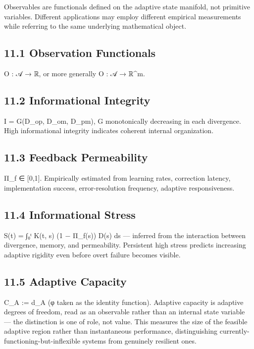 \documentclass[
]{article}
\begin{document}
Observables are functionals defined on the adaptive state manifold, not
primitive variables. Different applications may employ different
empirical measurements while referring to the same underlying
mathematical object.

\hypertarget{observation-functionals}{%
\subsection{11.1 Observation
Functionals}\label{observation-functionals}}

O : 𝒜 → ℝ, or more generally O : 𝒜 → ℝ\^{}m.

\hypertarget{informational-integrity-1}{%
\subsection{11.2 Informational
Integrity}\label{informational-integrity-1}}

I = G(D\_op, D\_om, D\_pm), G monotonically decreasing in each
divergence. High informational integrity indicates coherent internal
organization.

\hypertarget{feedback-permeability-1}{%
\subsection{11.3 Feedback Permeability}\label{feedback-permeability-1}}

Π\_f ∈ {[}0,1{]}. Empirically estimated from learning rates, correction
latency, implementation success, error-resolution frequency, adaptive
responsiveness.

\hypertarget{informational-stress-1}{%
\subsection{11.4 Informational Stress}\label{informational-stress-1}}

S(t) = ∫₀ᵗ K(t, s) (1 − Π\_f(s)) D(s) ds --- inferred from the
interaction between divergence, memory, and permeability. Persistent
high stress predicts increasing adaptive rigidity even before overt
failure becomes visible.

\hypertarget{adaptive-capacity}{%
\subsection{11.5 Adaptive Capacity}\label{adaptive-capacity}}

C\_A := d\_A (φ taken as the identity function). Adaptive capacity is
adaptive degrees of freedom, read as an observable rather than an
internal state variable --- the distinction is one of role, not value.
This measures the size of the feasible adaptive region rather than
instantaneous performance, distinguishing
currently-functioning-but-inflexible systems from genuinely resilient
ones.
\end{document}
